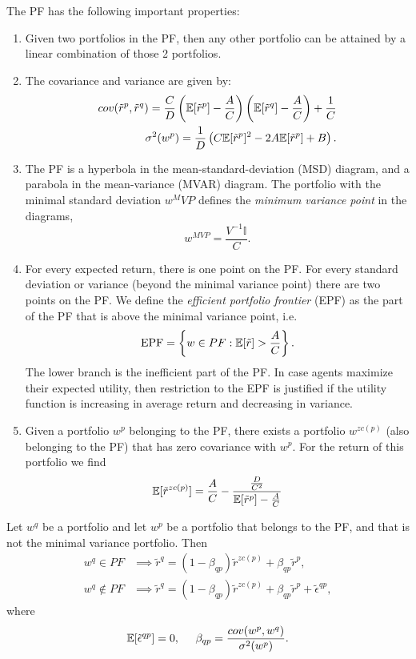 \documentclass[twoside]{article}
\begin{document}
The PF has the following important properties:
\begin{enumerate}
    \item Given two portfolios in the PF, then any other portfolio can be attained by a linear combination of those 2 portfolios.
    \item The covariance and variance are given by:
    \begin{align*}
        cov(\tilde{r}^p, \tilde{r}^q) = \frac{C}{D}\left(\mathbb{E}[\tilde{r}^p] - \frac{A}{C}\right)\left(\mathbb{E}[\tilde{r}^q] - \frac{A}{C}\right) + \frac{1}{C} \\
        \sigma^2(w^p) = \frac{1}{D}\left(C\mathbb{E}[\tilde{r}^p]^2 - 2A\mathbb{E}[\tilde{r}^p] + B\right).
    \end{align*}
    \item The PF is a hyperbola in the mean-standard-deviation (MSD) diagram, and a parabola in the mean-variance (MVAR) diagram. The portfolio with the minimal standard deviation $w^MVP$ defines the \textit{minimum variance point} in the diagrams,
    \[
        w^{MVP} = \frac{V^{-1} \mathbb{I}}{C}.
    \]
    \item For every expected return, there is one point on the PF. For every standard deviation or variance (beyond the minimal variance point) there are two points on the PF. We define the \textit{efficient portfolio frontier} (EPF) as the part of the PF that is above the minimal variance point, i.e.
    \[
        \text{EPF} = \left\{w \in PF : \mathbb{E}[\tilde{r}] > \frac{A}{C}\right\}.
    \]
    The lower branch is the inefficient part of the PF. In case agents maximize their expected utility, then restriction to the EPF is justified if the utility function is increasing in average return and decreasing in variance.

    \item Given a portfolio $w^p$ belonging to the PF, there exists a portfolio $w^{zc(p)}$ (also belonging to the PF) that has zero covariance with $w^p$. For the return of this portfolio we find
    \[
        \mathbb{E}[\tilde{r}^{zc(p)}] = \frac{A}{C} - \frac{\frac{D}{C^2}}{\mathbb{E}[\tilde{r}^p] - \frac{A}{C}}
    \]
\end{enumerate}

\begin{proposition} \label{prop:3.4}
    Let $w^q$ be a portfolio and let $w^p$ be a portfolio that belongs to the PF, and that is not the minimal variance portfolio. Then
    \begin{align*}
        w^q \in PF &\implies \tilde{r}^q = (1-\beta_{qp})\tilde{r}^{zc(p)} + \beta_{qp}\tilde{r}^p, \\
        w^q \not\in PF &\implies \tilde{r}^q = (1-\beta_{qp})\tilde{r}^{zc(p)} + \beta_{qp}\tilde{r}^p + \tilde{\epsilon}^{qp},
    \end{align*}
    where
    \[
        \mathbb{E}[\tilde{\epsilon}^{qp}] = 0, \;\;\;\;\; \beta_{qp} = \frac{cov(w^p, w^q)}{\sigma^2(w^p)}.
    \]
\end{proposition}
\end{document}
